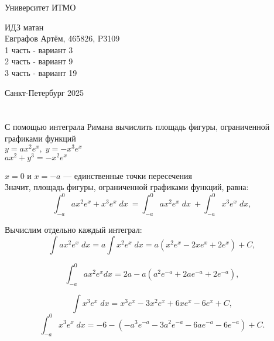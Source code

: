 


\thispagestyle{empty}
\begin{center}
\LARGE{Университет ИТМО} 
\vspace{20pt}

\vspace{180pt}

\LARGE{ИДЗ матан \\
Евграфов Артём, 465826, P3109\\ 
1 часть - вариант 3 \\
2 часть - вариант 9 \\
3 часть - вариант 19 \\}
\vspace{335pt}
\end{center}

\begin{center}
\Large{Санкт-Петербург 2025}
\end{center}

\newpage
\setcounter{page}{1}
\tableofcontents
\newpage
\section{}
\subsection{}
\subsubsection{}
С помощью интеграла Римана вычислить площадь фигуры,
ограниченной графиками функций \\
$y=ax^2e^x, \; y=-x^3e^x$ \\


\noindent
$ax^2 + y^3 = - x^2e^x$   

\noindent $ x = 0  \text{ и }  x = -a $ — единственные точки пересечения \\
Значит, площадь фигуры, ограниченной графиками функций, равна: \[\int_{-a}^0 ax^2e^x +x^3e^x \; dx\ = \int_{-a}^0 ax^2e^x\; dx\ + \int_{-a}^0 x^3e^x \; dx,\]

\noindent Вычислим отдельно каждый интеграл:
\[ \int ax^2 e^x \; dx = a \int x^2e^x \; dx = a (x^2e^x - 2x e^x + 2e^x) + C,
\]

\[\int_{-a}^0 ax^2e^xdx =  2a - a(a^2e^{-a} + 2ae^{-a} + 2e^{-a}),\]

\[
\int x^3e^x \; dx = x^3e^x - 3x^2e^x + 6xe^x - 6e^x + C,
\]  
\[
\int_{-a}^0 x^3e^x \; dx = -6 - (-a^3e^{-a} - 3a^2e^{-a} - 6ae^{-a} - 6e^{-a}) + C.
\]
 
